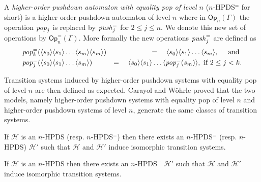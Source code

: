 \documentclass[a4paper,UKenglish,cleveref, autoref, thm-restate]{lipics-v2021}
\renewcommand{\H}{\mathcal{H}}
\newcommand{\Op}{\mathsf{Op}}
\begin{document}
A {\em higher-order pushdown automaton with equality pop of level $n$} ($n$-HPDS$^=$ for short) 
is a higher-order pushdown automaton of level $n$ where in
$\Op_n(\Gamma)$
 the operation 
 $\text{\textit{pop}}_j$  
  is replaced by 
$\text{\textit{push}}_j^=$
for $2 \leq j \leq n$.
We denote
this new set of operations by 
$\Op_n^=(\Gamma)$. 
More formally the new operations $\text{\textit{push}}_j^=$ are defined as
\begin{eqnarray*}
&\text{\textit{pop}}_k^=( \langle s_0 \rangle \langle s_1 \rangle \ldots  \langle s_m \rangle \langle s_m \rangle) &=\quad  \langle s_0 \rangle \langle s_1 \rangle \ldots \langle s_m \rangle , \quad \text{ and }\\
&\text{\textit{pop}}_j^=( \langle s_0 \rangle \langle s_1 \rangle \ldots \langle s_m \rangle) &=\quad \langle s_0 \rangle \langle s_1 \rangle \ldots 
\langle \text{\textit{pop}}_j^=(s_m) \rangle,
\text{ if } 2 \leq j < k. 
\end{eqnarray*}
%
%
%
%

%
Transition systems induced by higher-order pushdown systems with equality pop of level $n$
are then defined as expected.  
Carayol and W\"ohrle proved \cite{Woeh05, carayol2006automates} that the two models,
namely
higher-order pushdown systems with equality pop of level $n$
and
higher-order pushdown systems of level $n$,
generate the same classes of transition systems.





\begin{theorem}{\cite{Woeh05, carayol2006automates}}
If $\H$ is an $n$-HPDS (resp. $n$-HPDS$^=$) then there
exists an $n$-HPDS$^=$ (resp. $n$-HPDS) $\H'$ such that
$\H$ and $\H'$ %
induce isomorphic transition systems.
\end{theorem}

\iffalse
\begin{theorem}{\cite{Woeh05, carayol2006automates}}
If $\H$ is an $n$-HPDS  then there
exists an $n$-HPDS$^=$  $\H'$ such that
$\H$ and $\H'$ %
induce isomorphic transition systems.
\end{theorem}
\end{document}
